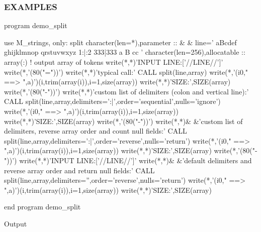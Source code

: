 \subsubsection*{E\+X\+A\+M\+P\+L\+ES}

\begin{DoxyVerb}program demo_split

 use M_strings, only: split
 character(len=*),parameter     :: &
 & line='  aBcdef   ghijklmnop qrstuvwxyz  1:|:2     333|333 a B cc    '
 character(len=256),allocatable :: array(:) ! output array of tokens
    write(*,*)'INPUT LINE:['//LINE//']'
 write(*,'(80("="))')
    write(*,*)'typical call:'
    CALL split(line,array)
    write(*,'(i0," ==> ",a)')(i,trim(array(i)),i=1,size(array))
    write(*,*)'SIZE:',SIZE(array)
 write(*,'(80("-"))')
  write(*,*)'custom list of delimiters (colon and vertical line):'
  CALL split(line,array,delimiters=':|',order='sequential',nulls='ignore')
  write(*,'(i0," ==> ",a)')(i,trim(array(i)),i=1,size(array))
  write(*,*)'SIZE:',SIZE(array)
 write(*,'(80("-"))')
  write(*,*)&
  &'custom list of delimiters, reverse array order and count null fields:'
    CALL split(line,array,delimiters=':|',order='reverse',nulls='return')
    write(*,'(i0," ==> ",a)')(i,trim(array(i)),i=1,size(array))
    write(*,*)'SIZE:',SIZE(array)
 write(*,'(80("-"))')
    write(*,*)'INPUT LINE:['//LINE//']'
    write(*,*)&
    &'default delimiters and reverse array order and return null fields:'
    CALL split(line,array,delimiters='',order='reverse',nulls='return')
    write(*,'(i0," ==> ",a)')(i,trim(array(i)),i=1,size(array))
    write(*,*)'SIZE:',SIZE(array)

end program demo_split
\end{DoxyVerb}


Output

